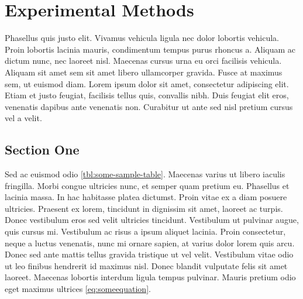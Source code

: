 \chapter{Experimental Methods\label{ch:methods}}
  Phasellus quis justo elit. Vivamus vehicula ligula nec dolor lobortis vehicula. Proin lobortis lacinia mauris, condimentum tempus purus rhoncus a. Aliquam ac dictum nunc, nec laoreet nisl. Maecenas cursus urna eu orci facilisis vehicula. Aliquam sit amet sem sit amet libero ullamcorper gravida. Fusce at maximus sem, ut euismod diam. Lorem ipsum dolor sit amet, consectetur adipiscing elit. Etiam et justo feugiat, facilisis tellus quis, convallis nibh. Duis feugiat elit eros, venenatis dapibus ante venenatis non. Curabitur ut ante sed nisl pretium cursus vel a velit.
  \pagebreak

  \section{Section One\label{sec:methods-one}}
    Sed ac euismod odio \cref{tbl:some-sample-table}. Maecenas varius ut libero iaculis fringilla. Morbi congue ultricies nunc, et semper quam pretium eu. Phasellus et lacinia massa. In hac habitasse platea dictumst. Proin vitae ex a diam posuere ultricies. Praesent ex lorem, tincidunt in dignissim sit amet, laoreet ac turpis. Donec vestibulum eros sed velit ultricies tincidunt. Vestibulum ut pulvinar augue, quis cursus mi. Vestibulum ac risus a ipsum aliquet lacinia. Proin consectetur, neque a luctus venenatis, nunc mi ornare sapien, at varius dolor lorem quis arcu. Donec sed ante mattis tellus gravida tristique ut vel velit. Vestibulum vitae odio ut leo finibus hendrerit id maximus nisl. Donec blandit vulputate felis sit amet laoreet. Maecenas lobortis interdum ligula tempus pulvinar. Mauris pretium odio eget maximus ultrices \cref{eq:someequation}.
